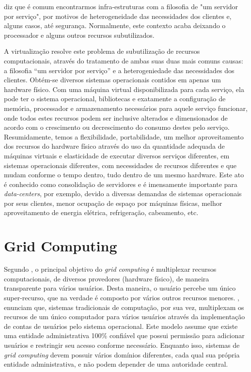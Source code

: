  diz que é comum encontrarmos infra-estruturas com a filosofia de "um servidor
por serviço", por motivos de heterogeneidade das necessidades dos clientes e, alguns casos, até segurança. Normalmente, este
contexto acaba deixando o processador e alguns outros recursos subutilizados.

A virtualização resolve este problema de subutilização de recursos computacionais,
através do tratamento de ambas suas duas mais comuns causas: a filosofia ``um servidor por serviço'' e
a heterogeniedade das necessidades dos clientes.
Obtém-se diversos sistemas operacionais contidos em apenas um
hardware físico. Com uma máquina virtual disponibilizada para cada serviço, ela pode ter o sistema operacional,
bibliotecas e exatamente a configuração de memória, processador e armazenamento necessários para aquele serviço
funcionar, onde todos estes recursos podem ser inclusive alterados e dimensionados de acordo com o
crescimento ou decrescimento do consumo destes pelo serviço. Resumidamente, temos a flexibilidade, portabilidade,
um melhor aproveitamento dos recursos do hardware físico através do uso da quantidade adequada de máquinas virtuais e
elasticidade de executar diversos serviços diferentes, em sistemas operacionais diferentes, com necessidades de recursos
diferentes e que mudam conforme o tempo dentro, tudo dentro de um mesmo hardware. Este ato é conhecido como consolidação de servidores
e é imensamente importante para \textit{data-centers}, por exemplo, devido a diversas demandas de sistemas operacionais
por seus clientes, menor ocupação de espaço por máquinas físicas, melhor aproveitamento de energia elétrica, refrigeração, cabeamento, etc.

\section{Grid Computing}
\label{sec:grid}

Segundo , o principal objetivo do
\textit{grid computing} é multiplexar recursos computacionais, de diversos provedores (hardware físico), de maneira
transparente para vários usuários. Desta maneira, o usuário percebe um único super-recurso, que na verdade é composto
por vários outros recursos menores.
, enunciam que, sistemas tradicionais de computação, por sua vez, multiplexam os
recursos de um único computador para vários usuários através da implementação de contas de usuários pelo
sistema operacional. Este modelo assume que existe uma entidade administrativa 100\%
confiável que possui permissão para adicionar usuários e restringir seu acesso conforme necessário. Enquanto isso,
sistemas de \emph{grid computing} devem possuir vários domínios diferentes, cada qual sua própria entidade administrativa, e não
podem depender de uma autoridade central.

